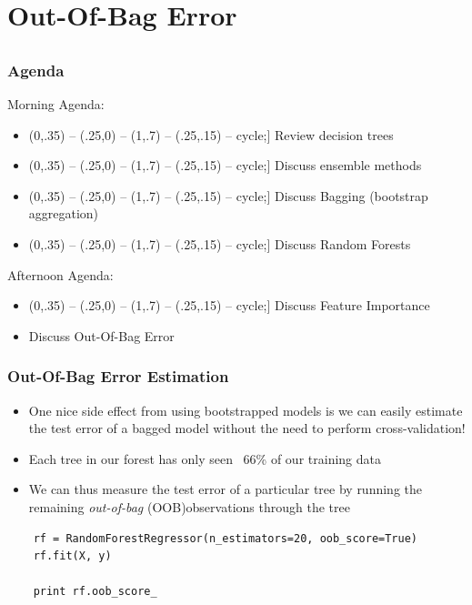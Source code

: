 \documentclass[table,dvipsnames]{beamer}
\def\checkmark{\tikz\fill[scale=0.4](0,.35) -- (.25,0) -- (1,.7) -- (.25,.15) -- cycle;}
\newcommand{\keywd}{\textcolor{myorange}}
\begin{document}
\section{Out-Of-Bag Error}
\subsection{}

\begin{frame}
\frametitle{Agenda}
\scriptsize
Morning Agenda:

\begin{block}{}
\begin{itemize}
    \item[\checkmark] Review decision trees
    \item[\checkmark] Discuss ensemble methods
    \item[\checkmark] Discuss \keywd{Bagging} (bootstrap aggregation)
    \item[\checkmark] Discuss \keywd{Random Forests}
\end{itemize}
\end{block}

Afternoon Agenda:

\begin{block}{}
\begin{itemize}
    \item[\checkmark] Discuss \keywd{Feature Importance}
    \item Discuss \keywd{Out-Of-Bag Error}
\end{itemize}
\end{block}
\end{frame}


\begin{frame}[fragile]{}
\frametitle{Out-Of-Bag Error Estimation}
\begin{itemize}
    \item One nice side effect from using bootstrapped models is we can easily estimate the test error of a bagged model without the need to perform cross-validation!
    \item Each tree in our forest has only seen ~66\% of our training data
    \item We can thus measure the test error of a particular tree by running the remaining \textit{out-of-bag} (\keywd{OOB})observations through the tree
\end{itemize}

\begin{verbatim}
    rf = RandomForestRegressor(n_estimators=20, oob_score=True)
    rf.fit(X, y)

    print rf.oob_score_
\end{verbatim}
\end{frame}
\end{document}
